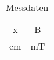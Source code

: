 \documentclass[captions=tableheading]{scrartcl}
\begin{document}


\begin{table}
  \centering
  \caption{Messdaten}
  \label{tab:some_data}
  \begin{tabular}{c c }
    \toprule
     x &	 B	   \\
     cm &   mT  \\
    \midrule
      
    \bottomrule
  \end{tabular}
\end{table}

\end{document}
